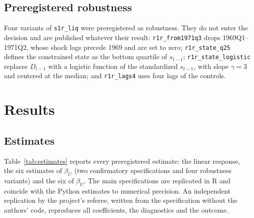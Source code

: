 \documentclass[11pt]{article}
\theoremstyle{remark}
\begin{document}
\subsection{Preregistered robustness}

Four variants of \texttt{s1r\_liq} were preregistered as robustness. They do not enter the decision and are published whatever
their result: \texttt{r1r\_from1971q3} drops 1969Q1--1971Q2, whose shock lags precede 1969 and are set to zero;
\texttt{r1r\_state\_q25} defines the constrained state as the bottom quartile of $s_{t-1}$; \texttt{r1r\_state\_logistic} replaces
$D_{t-1}$ with a logistic function of the standardized $s_{t-1}$, with slope $\gamma=3$ and centered at the median; and
\texttt{r1r\_lags4} uses four lags of the controls.

\section{Results}\label{sec:results}

\subsection{Estimates}

Table~\ref{tab:estimates} reports every preregistered estimate: the linear response, the six estimates of $\beta_C$ (two
confirmatory specifications and four robustness variants) and the six of $\beta_U$. The main specifications are replicated in R
and coincide with the Python estimates to numerical precision. An independent replication by the project's referee, written from
the specification without the authors' code, reproduces all coefficients, the diagnostics and the outcome.
\end{document}
